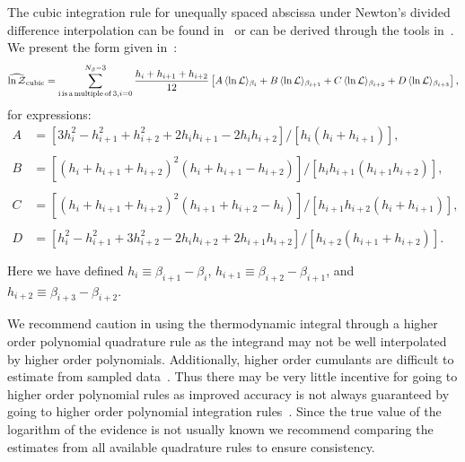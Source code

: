 The cubic integration rule for unequally spaced abscissa under Newton's divided difference interpolation can be found in~\cite{brun1953generalization,selmer1958numerical,chambers1989estimating} or can be derived through the tools in~\cite{abramowitz1965handbook}. We present the form given in~\cite{chambers1989estimating}:
\begin{equation}
    \widehat{\mathrm{ln} \, \mathcal{Z}}_{\mathrm{cubic}} = \sum_{\mathrm{i\, is\, a \, multiple \, of \, 3}, \\ i=0}^{N_\beta-3} \frac{h_i + h_{i+1} + h_{i+2}}{12} \left [A \, \langle \mathrm{ln} \, \mathcal{L} \rangle_{\beta_{i}} + B \, \langle \mathrm{ln} \, \mathcal{L} \rangle_{\beta_{i+1}} + C \, \langle \mathrm{ln} \, \mathcal{L} \rangle_{\beta_{i+2}} + D \, \langle \mathrm{ln} \, \mathcal{L} \rangle_{\beta_{i+3}}\right ],
\end{equation}
for expressions:
\begin{equation}
\begin{array}{llll}
     A &= \left [3h_i^2 -h_{i+1}^2 +h_{i+2}^2 +2 h_i h_{i+1} - 2h_i h_{i+2}\right] / \left [h_i (h_i + h_{i+1}) \right ], \\ \\
     B &= \left [(h_i + h_{i+1} + h_{i+2})^2 (h_i + h_{i+1} - h_{i+2})\right ]  / \left[h_{i} h_{i+1} (h_{i+1} h_{i+2})\right ], \\ \\
     C &= \left [(h_i + h_{i+1} + h_{i+2})^2 (h_{i+1} + h_{i+2} - h_i)\right ] / \left [ h_{i+1} h_{i+2} (h_i + h_{i+1}) \right], \\ \\
     D &= \left [ h_i^2 - h_{i+1}^2 +3 h_{i+2}^2 - 2h_i h_{i+2} + 2 h_{i+1} h_{i+2}\right ] /\left [h_{i+2}(h_{i+1} + h_{i+2}) \right].\\ \\
\end{array}
\end{equation}
Here we have defined $h_i \equiv \beta_{i+1} - \beta_{i}$, $h_{i+1} \equiv \beta_{i+2} - \beta_{i+1}$, and $h_{i+2} \equiv \beta_{i+3} - \beta_{i+2}$.

We recommend caution in using the thermodynamic integral through a higher order polynomial quadrature rule as the integrand may not be well interpolated by higher order polynomials. Additionally, higher order cumulants are difficult to estimate from sampled data~\cite{kardar2007statistical}. Thus there may be very little incentive for going to higher order polynomial rules as improved accuracy is not always guaranteed by going to higher order polynomial integration rules~\citep{epperson1987runge}. Since the true value of the logarithm of the evidence is not usually known we recommend comparing the estimates from all available quadrature rules to ensure consistency.

